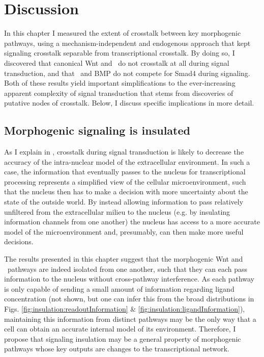 \section{Discussion}
\label{insulation:discussion}


In this chapter I measured the extent of crosstalk
between key morphogenic pathways, using a mechanism-independent
and endogenous approach that kept signaling crosstalk separable
from transcriptional crosstalk.
By doing so, I discovered that canonical Wnt and \tgf\
do not crosstalk at all during signal transduction, and that
\tgf\ and BMP do not compete for Smad4 during signaling.
Both of these results yield important simplifications to
the ever-increasing apparent complexity of signal transduction
that stems from discoveries of putative nodes of crosstalk.
Below, I discuss specific implications in more detail.


\subsection{Morphogenic signaling is insulated}


As I explain in , crosstalk during
signal transduction is likely to decrease the accuracy of the
intra-nuclear model of the extracellular environment. In such
a case, the information that eventually passes to the nucleus
for transcriptional processing represents a simplified view
of the cellular microenvironment, such that the nucleus then
has to make a decision with more uncertainty about the state of the outside world.
By instead allowing information to pass relatively unfiltered
from the extracellular milieu to the nucleus (e.g. by insulating
information channels from one another) the nucleus has access to a more
accurate model of the microenvironment and, presumably,
can then make more useful decisions.


The results presented in this chapter suggest that
the morphogenic Wnt and \tgfbsf\ pathways are indeed isolated
from one another, such that they can each pass information to
the nucleus without cross-pathway interference. As each pathway is only
capable of sending a small amount of information regarding
ligand concentration (not shown, but one can infer this from the broad distributions in Figs.
\ref{fig:insulation:readoutInformation} \&
\ref{fig:insulation:ligandInformation}), maintaining this
information from distinct pathways may be the only way
that a cell can obtain an accurate internal model of its
environment. Therefore, I propose that signaling insulation
may be a general property of morphogenic pathways whose
key outputs are changes to the transcriptional network.


